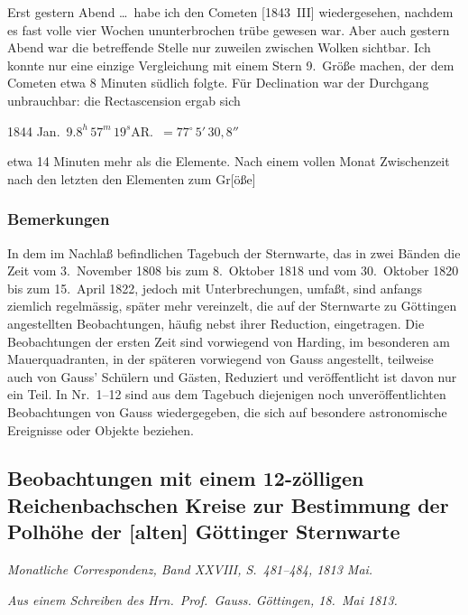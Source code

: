 \documentclass[12pt,a4paper]{article}
\newcommand{\degree}{\ensuremath{^\circ}}
\theoremstyle{plain}
\theoremstyle{definition}
\theoremstyle{remark}
\begin{document}
Erst gestern Abend \ldots\ habe ich den Cometen [1843~III] wiedergesehen, nachdem es fast volle vier Wochen ununterbrochen trübe gewesen war. Aber auch gestern Abend war die betreffende Stelle nur zuweilen zwischen Wolken sichtbar. Ich konnte nur eine einzige Vergleichung mit einem Stern 9.\ Größe machen, der dem Cometen etwa 8 Minuten südlich folgte. Für Declination war der Durchgang unbrauchbar: die Rectascension ergab sich

\begin{center}
1844 Jan.\ 9.\quad $8^h\,57^m\,19^s$\quad AR.\ $= 77\degree\,5'\,30{,}8''$
\end{center}
etwa 14 Minuten mehr als die Elemente. Nach einem vollen Monat Zwischenzeit nach den letzten den Elementen zum Gr[öße]

\newpage
\subsubsection*{Bemerkungen}

In dem im Nachlaß befindlichen Tagebuch der Sternwarte, das in zwei Bänden die Zeit vom 3.\ November 1808 bis zum 8.\ Oktober 1818 und vom 30.\ Oktober 1820 bis zum 15.\ April 1822, jedoch mit Unterbrechungen, umfaßt, sind anfangs ziemlich regelmässig, später mehr vereinzelt, die auf der Sternwarte zu Göttingen angestellten Beobachtungen, häufig nebst ihrer Reduction, eingetragen. Die Beobachtungen der ersten Zeit sind vorwiegend von Harding, im besonderen am Mauerquadranten, in der späteren vorwiegend von Gauss angestellt, teilweise auch von Gauss' Schülern und Gästen, Reduziert und veröffentlicht ist davon nur ein Teil. In Nr.\ 1--12 sind aus dem Tagebuch diejenigen noch unveröffentlichten Beobachtungen von Gauss wiedergegeben, die sich auf besondere astronomische Ereignisse oder Objekte beziehen.

\newpage
\subsection*{Beobachtungen mit einem 12-zölligen Reichenbachschen Kreise zur Bestimmung der Polhöhe der [alten] Göttinger Sternwarte}

\textit{Monatliche Correspondenz, Band XXVIII, S.~481--484, 1813 Mai.}

\textit{Aus einem Schreiben des Hrn.\ Prof.\ Gauss. Göttingen, 18.~Mai 1813.}
\end{document}
